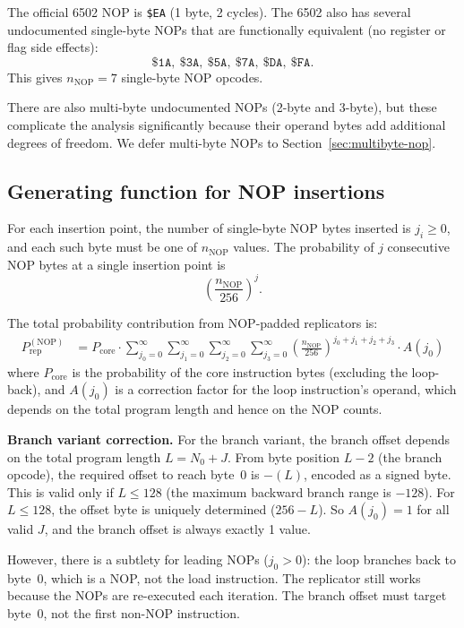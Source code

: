 \documentclass{article}
\newcommand{\hex}[1]{\texttt{\$#1}}
\newcommand{\Prep}{P_{\mathrm{rep}}}
\begin{document}
The official 6502 NOP is \hex{EA} (1 byte, 2 cycles). The 6502 also
has several undocumented single-byte NOPs that are functionally
equivalent (no register or flag side effects):
\[
  \hex{1A},\ \hex{3A},\ \hex{5A},\ \hex{7A},\ \hex{DA},\ \hex{FA}.
\]
This gives $n_{\mathrm{NOP}} = 7$ single-byte NOP opcodes.

There are also multi-byte undocumented NOPs (2-byte and 3-byte), but
these complicate the analysis significantly because their operand bytes
add additional degrees of freedom. We defer multi-byte NOPs to
Section~\ref{sec:multibyte-nop}.

\subsection{Generating function for NOP insertions}

For each insertion point, the number of single-byte NOP bytes inserted
is $j_i \ge 0$, and each such byte must be one of $n_{\mathrm{NOP}}$
values. The probability of $j$ consecutive NOP bytes at a single
insertion point is
\[
  \left(\frac{n_{\mathrm{NOP}}}{256}\right)^j.
\]

The total probability contribution from NOP-padded replicators is:
\begin{align}
  \Prep^{(\mathrm{NOP})} &= P_{\mathrm{core}} \cdot \sum_{j_0=0}^{\infty} \sum_{j_1=0}^{\infty} \sum_{j_2=0}^{\infty} \sum_{j_3=0}^{\infty} \left(\frac{n_{\mathrm{NOP}}}{256}\right)^{j_0+j_1+j_2+j_3} \cdot A(j_0) \label{eq:nop-sum}
\end{align}
where $P_{\mathrm{core}}$ is the probability of the core instruction
bytes (excluding the loop-back), and $A(j_0)$ is a correction factor
for the loop instruction's operand, which depends on the total program
length and hence on the NOP counts.

\textbf{Branch variant correction.}
For the branch variant, the branch offset depends on the total program
length $L = N_0 + J$. From byte position $L - 2$ (the branch opcode),
the required offset to reach byte~0 is $-(L)$, encoded as a signed byte.
This is valid only if $L \le 128$ (the maximum backward branch range
is $-128$). For $L \le 128$, the offset byte is uniquely determined
($256 - L$). So $A(j_0) = 1$ for all valid $J$, and the branch
offset is always exactly 1 value.

However, there is a subtlety for leading NOPs ($j_0 > 0$): the loop
branches back to byte~0, which is a NOP, not the load instruction.
The replicator still works because the NOPs are re-executed each
iteration. The branch offset must target byte~0, not the first
non-NOP instruction.
\end{document}

